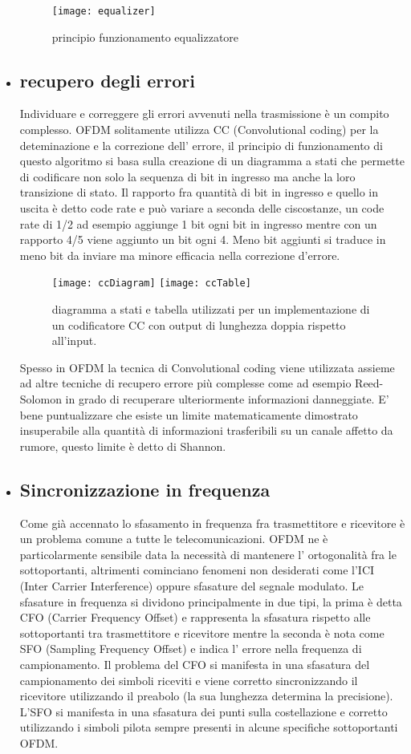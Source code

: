\begin{itemize}
     \begin{figure}[h]
     	\centering
     	\texttt{[image: equalizer]}
     	\caption{principio funzionamento equalizzatore \cite{equalizer}}\label{fig:1}
     \end{figure}
 \item \subsection{recupero degli errori} Individuare e correggere gli errori avvenuti nella trasmissione è un compito complesso. OFDM solitamente utilizza CC (Convolutional coding) per la deteminazione e la correzione dell' errore, il principio di funzionamento di questo algoritmo si basa sulla creazione di un diagramma a stati che permette di codificare non solo la sequenza di bit in ingresso ma anche la loro transizione di stato. Il rapporto fra quantità di bit in ingresso e quello in uscita è detto code rate e può variare a seconda delle ciscostanze, un code rate di 1/2 ad esempio aggiunge 1 bit ogni bit in ingresso mentre con un rapporto 4/5 viene aggiunto un bit ogni 4. Meno bit aggiunti si traduce in meno bit da inviare ma minore efficacia nella correzione d'errore.
 \cite{cc}
	 \begin{figure}[h]
	 	\centering
	 	\texttt{[image: ccDiagram]}
	 	\texttt{[image: ccTable]}
	 	\caption{diagramma a stati e tabella utilizzati per un implementazione di un codificatore CC con output di lunghezza doppia rispetto all'input.}\label{fig:1}
	 \end{figure}
 Spesso in OFDM la tecnica di Convolutional coding viene utilizzata assieme ad altre tecniche di recupero errore più complesse come ad esempio Reed-Solomon in grado di recuperare ulteriormente informazioni danneggiate.
 E' bene puntualizzare che esiste un limite matematicamente dimostrato insuperabile alla quantità di informazioni trasferibili su un canale affetto da rumore, questo limite è detto di Shannon.
 \cite{ofdmWiki}
 \item \subsection{Sincronizzazione in frequenza}
 Come già accennato lo sfasamento in frequenza fra trasmettitore e ricevitore è un problema comune a tutte le telecomunicazioni. OFDM ne è particolarmente sensibile data la necessità di mantenere l' ortogonalità fra le sottoportanti, altrimenti cominciano fenomeni non desiderati come l'ICI (Inter Carrier Interference) oppure sfasature del segnale modulato. Le sfasature in frequenza si dividono principalmente in due tipi, la prima è detta CFO (Carrier Frequency Offset) e rappresenta la sfasatura rispetto alle sottoportanti tra trasmettitore e ricevitore mentre la seconda è nota come SFO (Sampling Frequency Offset) e indica l' errore nella frequenza di campionamento. Il problema del CFO si manifesta in una sfasatura del campionamento dei simboli riceviti e viene corretto sincronizzando il ricevitore utilizzando il preabolo (la sua lunghezza determina la precisione). L'SFO si manifesta in una sfasatura dei punti sulla costellazione e corretto utilizzando i simboli pilota sempre presenti in alcune specifiche sottoportanti OFDM. \cite{FOOFDM}

\end{itemize}
